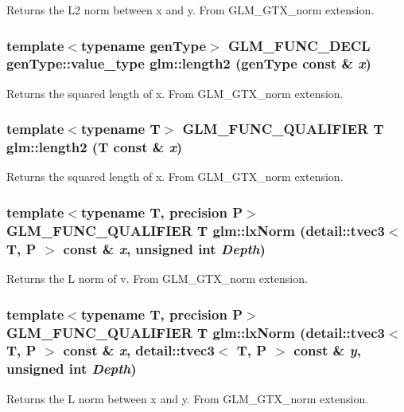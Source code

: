 Returns the L2 norm between x and y. From GLM\_\-GTX\_\-norm extension. \hypertarget{group__gtx__norm_g2dfcdff0cc9119aa37c501d2c7a45020}{
\subsubsection[length2]{\setlength{\rightskip}{0pt plus 5cm}template$<$typename genType$>$ GLM\_\-FUNC\_\-DECL genType::value\_\-type glm::length2 (genType const \& {\em x})}}
\label{group__gtx__norm_g2dfcdff0cc9119aa37c501d2c7a45020}


Returns the squared length of x. From GLM\_\-GTX\_\-norm extension. \hypertarget{group__gtx__norm_g6f970aba05e1299ed89d2ec3a410b7a9}{
\subsubsection[length2]{\setlength{\rightskip}{0pt plus 5cm}template$<$typename T$>$ GLM\_\-FUNC\_\-QUALIFIER T glm::length2 (T const \& {\em x})}}
\label{group__gtx__norm_g6f970aba05e1299ed89d2ec3a410b7a9}


Returns the squared length of x. From GLM\_\-GTX\_\-norm extension. \hypertarget{group__gtx__norm_g955869c61ab902e4e3cf061303efdaef}{
\subsubsection[lxNorm]{\setlength{\rightskip}{0pt plus 5cm}template$<$typename T, precision P$>$ GLM\_\-FUNC\_\-QUALIFIER T glm::lxNorm (detail::tvec3$<$ T, P $>$ const \& {\em x}, \/  unsigned int {\em Depth})}}
\label{group__gtx__norm_g955869c61ab902e4e3cf061303efdaef}


Returns the L norm of v. From GLM\_\-GTX\_\-norm extension. \hypertarget{group__gtx__norm_g2f42190c8743abab279d0a8f5a321692}{
\subsubsection[lxNorm]{\setlength{\rightskip}{0pt plus 5cm}template$<$typename T, precision P$>$ GLM\_\-FUNC\_\-QUALIFIER T glm::lxNorm (detail::tvec3$<$ T, P $>$ const \& {\em x}, \/  detail::tvec3$<$ T, P $>$ const \& {\em y}, \/  unsigned int {\em Depth})}}
\label{group__gtx__norm_g2f42190c8743abab279d0a8f5a321692}


Returns the L norm between x and y. From GLM\_\-GTX\_\-norm extension. 